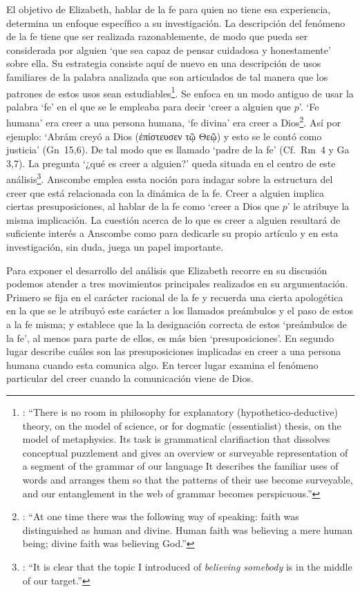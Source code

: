 El objetivo de Elizabeth, hablar de la fe para quien no tiene esa experiencia, determina un enfoque específico a su investigación. La descripción del fenómeno de la fe tiene que ser realizada razonablemente, de modo que pueda ser considerada por alguien \enquote*{que sea capaz de pensar cuidadosa y honestamente} sobre ella. Su estrategia consiste aquí de nuevo en una descripción de usos familiares de la palabra analizada que son articulados de tal manera que los patrones de estos usos sean estudiables\footnote{\cite[Cf.~][12]{bakerhacker2009understanding}: \enquote{There is no room in philosophy for explanatory (hypothetico-deductive) theory, on the model of science, or for dogmatic (essentialist) thesis, on the model of metaphysics. Its task is grammatical clarifiaction that dissolves conceptual puzzlement and gives an overview or surveyable representation of a segment of the grammar of our language \textelp{} It describes the familiar uses of words and arranges them so that the patterns of their use become surveyable, and our entanglement in the web of grammar becomes perspicuous.}}. Se enfoca en un modo antiguo de usar la palabra `fe' en el que se le empleaba para decir \enquote*{creer a alguien que $p$}. `Fe humana' era creer a una persona humana, `fe divina' era creer a Dios\footnote{\cite[Cf.~][2]{anscombe2008faith:tobelieve}: \enquote{At one time there was the following way of speaking: faith was distinguished as human and divine. Human faith was believing a mere human being; divine faith was believing God.}}. Así por ejemplo: \enquote*{Abrám creyó a Dios (\textgreek{ἐπίστευσεν τῷ Θεῷ}) y esto se le contó como justicia} (Gn~15,6). De tal modo que es llamado \enquote*{padre de la fe} (Cf.~Rm~4 y Ga 3,7). La pregunta \enquote*{¿qué es creer a alguien?} queda situada en el centro de este análisis\footnote{\cite[Cf.~][116]{anscombe1981erp:faith}: \enquote{It is clear that the topic I introduced of \emph{believing somebody} is in the middle of our target.}}. Anscombe emplea essta noción para indagar sobre la estructura del creer que está relacionada con la dinámica de la fe. Creer a alguien implica ciertas presuposiciones, al hablar de la fe como \enquote*{creer a Dios que $p$} le atribuye la misma implicación. La cuestión acerca de lo que es creer a alguien resultará de suficiente interés a Anscombe como para dedicarle su propio artículo y en esta investigación, sin duda, juega un papel importante.

Para exponer el desarrollo del análisis que Elizabeth recorre en su discusión podemos atender a tres movimientos principales realizados en su argumentación. Primero se fija en el carácter racional de la fe y recuerda una cierta apologética en la que se le atribuyó este carácter a los llamados preámbulos y el paso de estos a la fe misma; y establece que la la designación correcta de estos `preámbulos de la fe', al menos para parte de ellos, es más bien `presuposiciones'. En segundo lugar describe cuáles son las presuposiciones implicadas en creer a una persona humana cuando esta comunica algo. En tercer lugar examina el fenómeno particular del creer cuando la comunicación viene de Dios.


